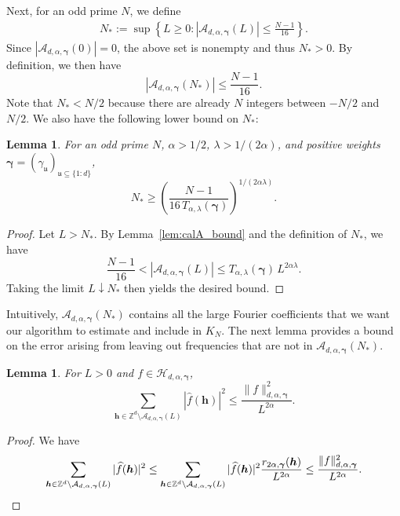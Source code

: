 \documentclass[a4paper,11pt]{article}
\newtheorem{lemma}[theorem]{Lemma}
\newcommand{\bsh}{\boldsymbol{h}}
\newcommand{\bsgamma}{\boldsymbol{\gamma}}
\newcommand{\ZZ}{\mathbb{Z}}
\newcommand{\Acal}{\mathcal{A}}
\newcommand{\Hcal}{\mathcal{H}}
\newcommand{\fraku}{\mathfrak{u}}
\begin{document}
Next, for an odd prime $N$, we define
\begin{align}\label{eq:N_star_def} 
    N_* := \sup \left\{ L \ge 0 : |\Acal_{d,\alpha,\bsgamma}(L)| \le \frac{N-1}{16} \right\}.
\end{align}
Since $|\Acal_{d,\alpha,\bsgamma}(0)| = 0$, the above set is nonempty and thus $N_* > 0$. 
By definition, we then have
\begin{equation}\label{eqn:Nstar}
   |\Acal_{d,\alpha,\bsgamma}(N_*)| \le \frac{N-1}{16}.
\end{equation}
Note that $N_* < N/2$ because there are already $N$ integers between $-N/2$ and $N/2$. 
We also have the following lower bound on $N_*$:

\begin{lemma}\label{lem:Nstarlowerbound}
For an odd prime $N$, $\alpha>1/2$, $\lambda > 1/(2\alpha)$, and positive weights $\bsgamma=(\gamma_{\fraku})_{\fraku\subseteq \{1{:}d\}}$,
\[
N_* \ge \left( \frac{N-1}{16\, T_{\alpha,\lambda}(\bsgamma)} \right)^{1/(2\alpha\lambda)}.
\]
\end{lemma}

\begin{proof} 
Let $L > N_*$. By Lemma~\ref{lem:calA_bound} and the definition of $N_*$, we have
\[
\frac{N-1}{16} < |\Acal_{d,\alpha,\bsgamma}(L)| \le T_{\alpha,\lambda}(\bsgamma)\, L^{2 \alpha \lambda}.
\]
Taking the limit $L \downarrow N_*$ then yields the desired bound.
\end{proof}

Intuitively, $\Acal_{d,\alpha,\bsgamma}(N_*)$ contains all the large Fourier coefficients that we want our algorithm to estimate and include in $K_N$. 
The next lemma provides a bound on the error arising from leaving out frequencies that are not in $\Acal_{d,\alpha,\bsgamma}(N_*)$.

\begin{lemma}\label{lem:sumnotinL} 
For $L>0$ and $f \in \Hcal_{d,\alpha,\bsgamma}$,
    $$\sum_{\bsh \in \ZZ^d\setminus \Acal_{d,\alpha,\bsgamma}(L)}|\widehat{f}(\bsh)|^2\leq \frac{\|f\|^2_{d,\alpha,\bsgamma}}{L^{2\alpha} }.$$
\end{lemma}
\begin{proof}
We have
\[
\sum_{\bsh \in \ZZ^d \setminus \Acal_{d,\alpha,\bsgamma}(L)} |\widehat{f}(\bsh)|^2
\le \sum_{\bsh \in \ZZ^d \setminus \Acal_{d,\alpha,\bsgamma}(L)} 
|\widehat{f}(\bsh)|^2 \frac{r_{2\alpha, \bsgamma}(\bsh)}{L^{2\alpha}}
\le \frac{\|f\|^2_{d,\alpha,\bsgamma}}{L^{2\alpha}}. \qedhere
\]
\end{proof}
\end{document}
